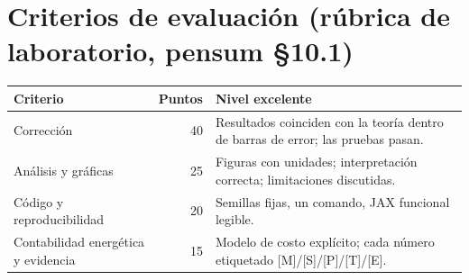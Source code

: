 \documentclass[11pt,a4paper]{article}
\begin{document}
\section*{Criterios de evaluación (rúbrica de laboratorio, pensum §10.1)}
\begin{tabularx}{\linewidth}{lrX}\toprule
Criterio & Puntos & Nivel excelente\\\midrule
Corrección & 40 & Resultados coinciden con la teoría dentro de barras de error; las pruebas pasan.\\
Análisis y gráficas & 25 & Figuras con unidades; interpretación correcta; limitaciones discutidas.\\
Código y reproducibilidad & 20 & Semillas fijas, un comando, JAX funcional legible.\\
Contabilidad energética y evidencia & 15 & Modelo de costo explícito; cada número etiquetado [M]/[S]/[P]/[T]/[E].\\\bottomrule
\end{tabularx}
\end{document}
